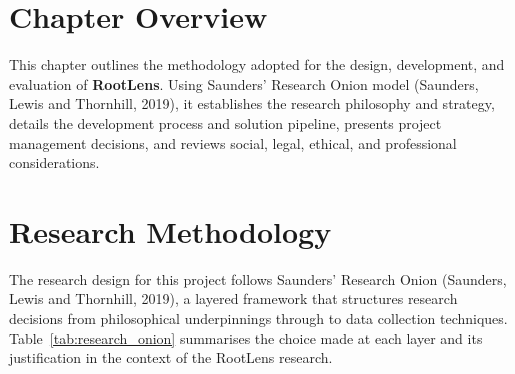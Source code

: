 
\section{Chapter Overview}
This chapter outlines the methodology adopted for the design, development, and evaluation of \textbf{RootLens}. Using Saunders' Research Onion model (Saunders, Lewis and Thornhill, 2019), it establishes the research philosophy and strategy, details the development process and solution pipeline, presents project management decisions, and reviews social, legal, ethical, and professional considerations.

\section{Research Methodology}
The research design for this project follows Saunders' Research Onion (Saunders, Lewis and Thornhill, 2019), a layered framework that structures research decisions from philosophical underpinnings through to data collection techniques. Table~\ref{tab:research_onion} summarises the choice made at each layer and its justification in the context of the RootLens research.

